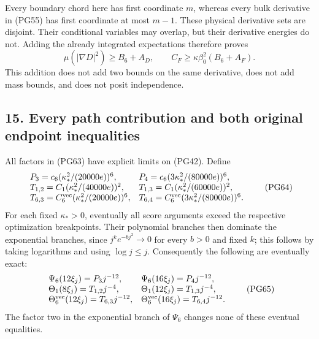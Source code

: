\documentclass[11pt]{article}
\begin{document}
Every boundary chord here has first coordinate \(m\), whereas
every bulk derivative in (PG55) has first coordinate at most
\(m-1\). These physical derivative sets are disjoint. Their
conditional variables may overlap, but their derivative energies
do not. Adding the already integrated expectations therefore proves
\[
 \boxed{\mu(|\nabla D|^2)\ge B_6+A_D,\qquad
 C_F\ge\kappa\beta_0^2(B_6+A_F).}
 \tag{PG63}
\]
This addition does not add two bounds on the same derivative,
does not add mass bounds, and does not posit independence.

\subsection*{15. Every path contribution and both original endpoint inequalities}

All factors in (PG63) have explicit limits on (PG42). Define
\[
 \begin{array}{ll}
 P_3=c_6(\kappa_*^2/(20000e))^6,&
 P_4=c_6(3\kappa_*^2/(80000e))^6,\\
 T_{1,2}=C_1(\kappa_*^2/(40000e))^2,&
 T_{1,3}=C_1(\kappa_*^2/(60000e))^2,\\
 T_{6,3}=C_6^{\rm vec}(\kappa_*^2/(20000e))^6,&
 T_{6,4}=C_6^{\rm vec}(3\kappa_*^2/(80000e))^6 .
 \end{array}\tag{PG64}
\]
For each fixed \(\kappa_*>0\), eventually all score arguments
exceed the respective optimization breakpoints. Their polynomial
branches then dominate the exponential branches, since
\(j^k e^{-b j^2}\to0\) for every \(b>0\) and fixed \(k\);
this follows by taking logarithms and using \(\log j\le j\).
Consequently the following are eventually exact:
\[
 \begin{array}{ll}
 \Psi_6(12\xi_j)=P_3j^{-12},&
 \Psi_6(16\xi_j)=P_4j^{-12},\\
 \Theta_1(8\xi_j)=T_{1,2}j^{-4},&
 \Theta_1(12\xi_j)=T_{1,3}j^{-4},\\
 \Theta_6^{\rm vec}(12\xi_j)=T_{6,3}j^{-12},&
 \Theta_6^{\rm vec}(16\xi_j)=T_{6,4}j^{-12}.
 \end{array}\tag{PG65}
\]
The factor two in the exponential branch of \(\Psi_6\) changes
none of these eventual equalities.
\end{document}
